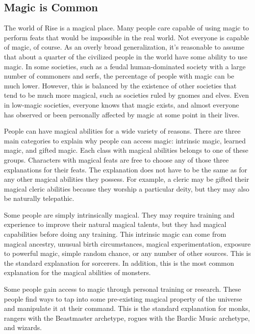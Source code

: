    \subsection{Magic is Common}
        The world of Rise is a magical place.
        Many people care capable of using magic to perform feats that would be impossible in the real world.
        Not everyone is capable of magic, of course.
        As an overly broad generalization, it's reasonable to assume that about a quarter of the civilized people in the world have some ability to use magic.
        In some societies, such as a feudal human-dominated society with a large number of commoners and serfs, the percentage of people with magic can be much lower.
        However, this is balanced by the existence of other societies that tend to be much more magical, such as societies ruled by gnomes and elves.
        Even in low-magic societies, everyone knows that magic exists, and almost everyone has observed or been personally affected by magic at some point in their lives.

        People can have magical abilities for a wide variety of reasons.
        There are three main categories to explain why people can access magic: intrinsic magic, learned magic, and gifted magic.
        Each class with magical abilities belongs to one of these groups.
        Characters with magical feats are free to choose any of those three explanations for their feats.
        The explanation does not have to be the same as for any other magical abilities they possess.
        For example, a cleric may be gifted their magical cleric abilities because they worship a particular deity, but they may also be naturally telepathic.

        Some people are simply intrinsically magical.
        They may require training and experience to improve their natural magical talents, but they had magical capabilities before doing any training.
        This intrinsic magic can come from magical ancestry, unusual birth circumstances, magical experimentation, exposure to powerful magic, simple random chance, or any number of other sources.
        This is the standard explanation for sorcerers.
        In addition, this is the most common explanation for the magical abilities of monsters.

        Some people gain access to magic through personal training or research.
        These people find ways to tap into some pre-existing magical property of the universe and manipulate it at their command.
        This is the standard explanation for monks, rangers with the Beastmaster archetype, rogues with the Bardic Music archetype, and wizards.


